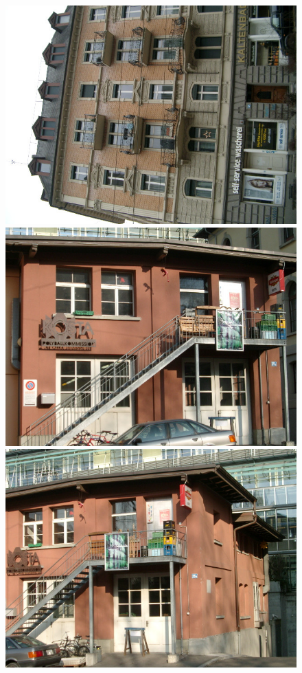\documentclass[10pt,conference,a4paper]{IEEEtran}
\begin{document}
\begin{figure}
{				\includegraphics[scale=0.123]{zubud4.jpg}
				\includegraphics[scale=0.123]{zubud5.jpg}
				\includegraphics[scale=0.123]{zubud6.jpg}
			}


\end{figure}
\end{document}
